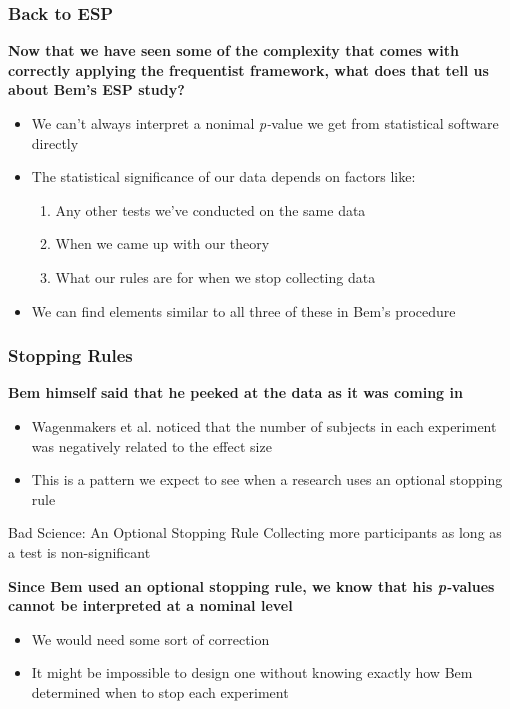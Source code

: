 \documentclass[10pt, block=fill]{beamer}
\begin{document}
\begin{frame}
    \frametitle{Back to ESP}

    \textbf{Now that we have seen some of the complexity that comes with correctly applying the frequentist framework, what does that tell us about Bem's ESP study?}   
    \begin{itemize}
        \item We can't always interpret a nonimal \textit{p-}value we get from statistical software directly
        \item The statistical significance of our data depends on factors like:
        \begin{enumerate}

            \item Any other tests we've conducted on the same data
            \item When we came up with our theory
            \item What our rules are for when we stop collecting data
        \end{enumerate}
        \item We can find elements similar to all three of these in Bem's procedure
    \end{itemize}
    

\end{frame}


\begin{frame}
    \frametitle{Stopping Rules}
    
    \textbf{Bem himself said that he peeked at the data as it was coming in}
    \begin{itemize}
        \item Wagenmakers et al. noticed that the number of subjects in each experiment was negatively related to the effect size
        \item This is a pattern we expect to see when a research uses an optional stopping rule
    \end{itemize}
    
    \begin{block}{Bad Science: An Optional Stopping Rule}
      Collecting more participants as long as a test is non-significant
    \end{block}
    
    \textbf{Since Bem used an optional stopping rule, we know that his \textit{p-}values cannot be interpreted at a nominal level}
    \begin{itemize}
        \item We would need some sort of correction
        \item It might be impossible to design one without knowing exactly how Bem determined when to stop each experiment
    \end{itemize}
\end{frame}
\end{document}
